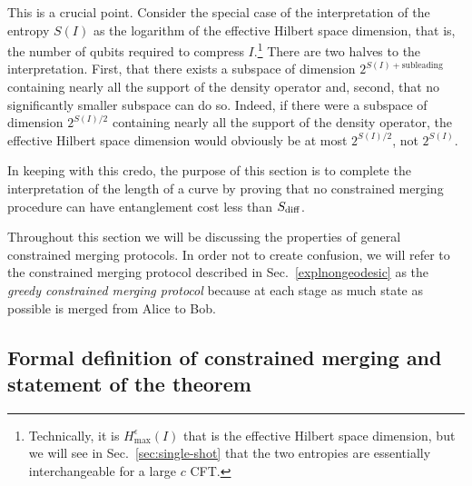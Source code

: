 \documentclass[12pt]{article}
\def\sdiff{S_{\rm diff}}
\newcommand{\Hmax}{H_{\max}}
\newcommand{\secref}[1]{Sec.~\ref{#1}}
\begin{document}
This is a crucial point. Consider the special case of the interpretation of the entropy $S(I)$ as the logarithm of the effective Hilbert space dimension, that is, the number of qubits required to compress $I$.\footnote{Technically, it is $\Hmax^\epsilon(I)$ that is the effective Hilbert space dimension, but we will see in Sec.~\ref{sec:single-shot} that the two entropies are essentially interchangeable for a large $c$ CFT.} There are two halves to the interpretation. First, that there exists a subspace of dimension $2^{S(I) + \text{subleading}}$ containing nearly all the support of the density operator and, second, that no significantly smaller subspace can do so. Indeed, if there were a subspace of dimension $2^{S(I)/2}$ containing nearly all the support of the density operator, the effective Hilbert space dimension would obviously be at most $2^{S(I)/2}$, not $2^{S(I)}$.

In keeping with this credo, the purpose of this section is to complete the interpretation of the length of a curve by proving that no constrained merging procedure can have entanglement cost less than $\sdiff$.

Throughout this section we will be discussing the properties of general constrained merging protocols. In order not to create confusion, we will refer to the constrained merging protocol described in \secref{explnongeodesic} as the \emph{greedy constrained merging protocol} because at each stage as much state as possible is merged from Alice to Bob.

\subsection{Formal definition of constrained merging and statement of the theorem}
\end{document}
